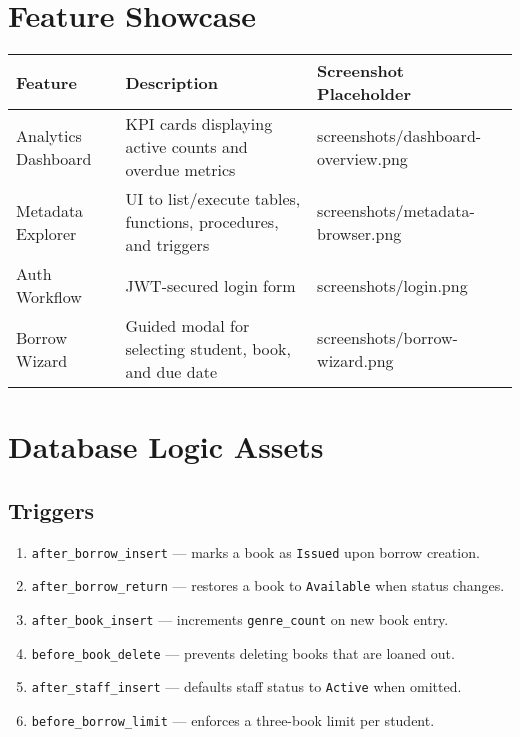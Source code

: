 \documentclass[12pt]{article}
\begin{document}
\section{Feature Showcase}
\begin{longtable}{@{}L{0.25\textwidth}L{0.38\textwidth}L{0.29\textwidth}@{}}
\toprule
Feature & Description & Screenshot Placeholder \\
\midrule
Analytics Dashboard & KPI cards displaying active counts and overdue metrics & screenshots/dashboard-overview.png \\
Metadata Explorer & UI to list/execute tables, functions, procedures, and triggers & screenshots/metadata-browser.png \\
Auth Workflow & JWT-secured login form & screenshots/login.png \\
Borrow Wizard & Guided modal for selecting student, book, and due date & screenshots/borrow-wizard.png \\
\bottomrule
\end{longtable}

\section{Database Logic Assets}
\subsection{Triggers}
\begin{enumerate}
  \item \texttt{after\_borrow\_insert} --- marks a book as \texttt{Issued} upon borrow creation.
  \item \texttt{after\_borrow\_return} --- restores a book to \texttt{Available} when status changes.
  \item \texttt{after\_book\_insert} --- increments \texttt{genre\_count} on new book entry.
  \item \texttt{before\_book\_delete} --- prevents deleting books that are loaned out.
  \item \texttt{after\_staff\_insert} --- defaults staff status to \texttt{Active} when omitted.
  \item \texttt{before\_borrow\_limit} --- enforces a three-book limit per student.
\end{enumerate}
\end{document}
